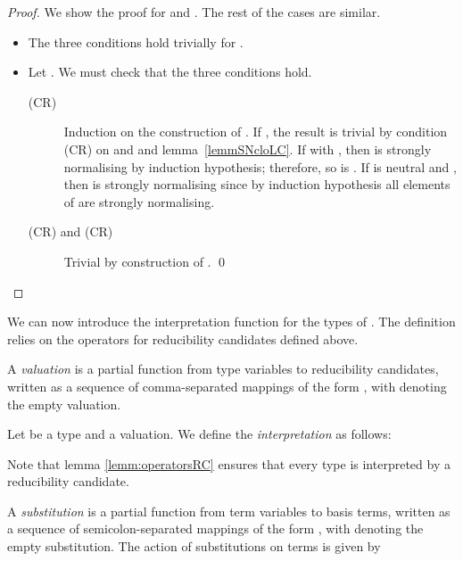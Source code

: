 \begin{proof} We show the proof for  and
  . The rest of the cases are similar.

\begin{itemize}
 \item The three conditions hold trivially for .
 \item Let . We must check that the
     three conditions hold.
     \begin{description}
     \item[(CR)] Induction on the construction of
       . If
       , the result is trivial by
       condition (CR) on  and  and
       lemma~\ref{lemmSNcloLC}. If  with
       , then  is strongly
       normalising by induction hypothesis; therefore, so is
       . If  is neutral and
       , then 
       is strongly normalising since by induction hypothesis all
       elements of  are strongly normalising.
      
      \item[(CR) and (CR)] Trivial by construction of
        . \qed
      \end{description}
\end{itemize}
  
\end{proof}

\newcommand{\interp}[1]{\ensuremath{\llbracket #1 \rrbracket}}

\noindent We can now introduce the interpretation function for the types of
\CA. The definition relies on the operators for reducibility
candidates defined above.

A \emph{valuation}  is a partial function from type variables to
reducibility candidates, written as a sequence of comma-separated
mappings of the form , with 
denoting the empty valuation.

\begin{definition} Let  be a type and  a
  valuation. We define the \emph{interpretation}  as follows:

\end{definition}

Note that lemma \ref{lemm:operatorsRC} ensures that every type is
interpreted by a reducibility candidate.

A \emph{substitution}  is a partial function from term
variables to basis terms, written as a sequence of semicolon-separated
mappings of the form , with  denoting the
empty substitution. The action of substitutions on terms is given by


